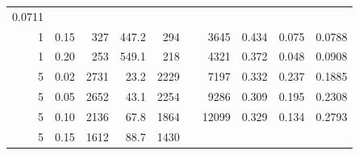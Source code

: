\begin{table}[!htb]
\begin{tabular}{r r r r r c r r r r}
    0.0711
    \\
    1                                         & 0.15
                                              & 327                            &
    447.2                                     & 294
                                              &                                &
    3645                                      & 0.434
                                              & 0.075                          &
    0.0788
    \\
    1                                         & 0.20
                                              & 253                            &
    549.1                                     & 218
                                              &                                &
    4321                                      & 0.372
                                              & 0.048                          &
    0.0908
    \\
    \midrule
    5                                         & 0.02
                                              & 2731                           &
    23.2                                      & 2229
                                              &                                &
    7197                                      & 0.332
                                              & 0.237                          &
    0.1885
    \\
    5                                         & 0.05
                                              & 2652                           &
    43.1                                      & 2254
                                              &                                &
    9286                                      & 0.309
                                              & 0.195                          &
    0.2308
    \\
    5                                         & 0.10
                                              & 2136                           &
    67.8                                      & 1864
                                              &                                &
    12099                                     & 0.329
                                              & 0.134                          &
    0.2793
    \\
    5                                         & 0.15
                                              & 1612                           &
    88.7                                      & 1430
                                              &                                &

\end{tabular}
\end{table}
